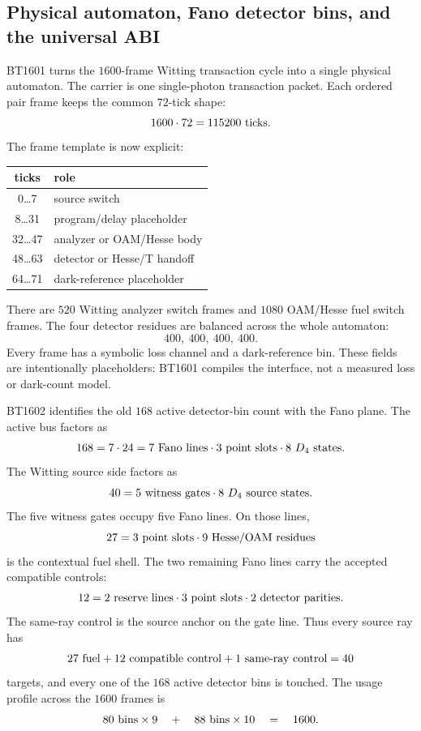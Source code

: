 \subsection{Physical automaton, Fano detector bins, and the universal ABI}
\label{sec:bt1601-bt1603-physical-fano-universal-closure}

BT1601 turns the \(1600\)-frame Witting transaction cycle into a single physical
automaton.  The carrier is one single-photon transaction packet.  Each ordered
pair frame keeps the common \(72\)-tick shape:
\[
  1600\cdot72=115200\ {\rm ticks}.
\]
The frame template is now explicit:
\begin{center}
\begin{tabular}{c|l}
ticks & role\\
\hline
0\ldots7 & source switch\\
8\ldots31 & program/delay placeholder\\
32\ldots47 & analyzer or OAM/Hesse body\\
48\ldots63 & detector or Hesse/T handoff\\
64\ldots71 & dark-reference placeholder
\end{tabular}
\end{center}
There are \(520\) Witting analyzer switch frames and \(1080\) OAM/Hesse fuel
switch frames.  The four detector residues are balanced across the whole
automaton:
\[
  400,\ 400,\ 400,\ 400.
\]
Every frame has a symbolic loss channel and a dark-reference bin.  These fields
are intentionally placeholders: BT1601 compiles the interface, not a measured
loss or dark-count model.

BT1602 identifies the old \(168\) active detector-bin count with the Fano plane.
The active bus factors as
\[
  168=7\cdot24=7\ {\rm Fano\ lines}\cdot3\ {\rm point\ slots}\cdot8\ D_4
  \ {\rm states}.
\]
The Witting source side factors as
\[
  40=5\ {\rm witness\ gates}\cdot8\ D_4\ {\rm source\ states}.
\]
The five witness gates occupy five Fano lines.  On those lines,
\[
  27=3\ {\rm point\ slots}\cdot9\ {\rm Hesse/OAM\ residues}
\]
is the contextual fuel shell.  The two remaining Fano lines carry the accepted
compatible controls:
\[
  12=2\ {\rm reserve\ lines}\cdot3\ {\rm point\ slots}\cdot2\ {\rm detector\
  parities}.
\]
The same-ray control is the source anchor on the gate line.  Thus every source
ray has
\[
  27\ {\rm fuel}+12\ {\rm compatible\ control}
  +1\ {\rm same\mbox{-}ray\ control}=40
\]
targets, and every one of the \(168\) active detector bins is touched.  The
usage profile across the \(1600\) frames is
\[
  80\ {\rm bins}\times9
  \quad+\quad
  88\ {\rm bins}\times10
  \quad=\quad1600.
\]

